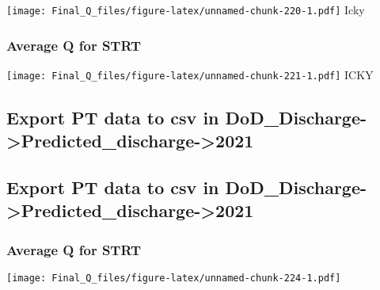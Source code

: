 \documentclass[
]{article}
\begin{document}
\texttt{[image: Final\_Q\_files/figure-latex/unnamed-chunk-220-1.pdf]}
Icky

\hypertarget{average-q-for-strt}{%
\subsubsection{Average Q for STRT}\label{average-q-for-strt}}

\texttt{[image: Final\_Q\_files/figure-latex/unnamed-chunk-221-1.pdf]}
ICKY

\hypertarget{export-pt-data-to-csv-in-dod_discharge-predicted_discharge-2021-4}{%
\subsection{Export PT data to csv in
DoD\_Discharge-\textgreater Predicted\_discharge-\textgreater2021}\label{export-pt-data-to-csv-in-dod_discharge-predicted_discharge-2021-4}}

\hypertarget{export-pt-data-to-csv-in-dod_discharge-predicted_discharge-2021-5}{%
\subsection{Export PT data to csv in
DoD\_Discharge-\textgreater Predicted\_discharge-\textgreater2021}\label{export-pt-data-to-csv-in-dod_discharge-predicted_discharge-2021-5}}

\hypertarget{average-q-for-strt-1}{%
\subsubsection{Average Q for STRT}\label{average-q-for-strt-1}}

\texttt{[image: Final\_Q\_files/figure-latex/unnamed-chunk-224-1.pdf]}
\end{document}
